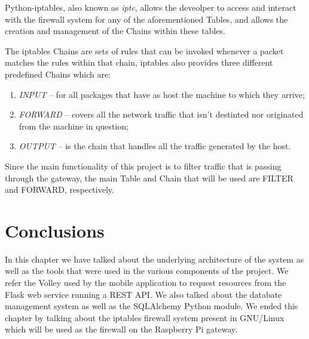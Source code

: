 Python-iptables, also known as \emph{iptc}, allows the deveolper to access and
interact with the firewall system for any of the aforementioned Tables, and
allows the creation and management of the Chains within these tables.

The iptables Chains are sets of rules that can be invoked whenever a packet
matches the rules within that chain, iptables also provides three different
predefined Chains which are:
\begin{enumerate}
	\item \emph{INPUT} -- for all packages that have as host the machine to
		which they arrive;
	\item \emph{FORWARD} -- covers all the network traffic that isn't destinted
		nor originated from the machine in question;
	\item \emph{OUTPUT} -- is the chain that handles all the traffic generated
		by the host.
\end{enumerate}

Since the main functionality of this project is to filter traffic that is
passing through the gateway, the main Table and Chain that will be used are
FILTER and FORWARD, respectively.

\section{Conclusions}
\label{chap3:sec:concs}
In this chapter we have talked about the underlying architecture of the system
as well as the tools that were used in the various components of the project.
We refer the Volley used by the mobile application to request resources from the
Flask web service running a REST API. We also talked about the databate
management system as well as the SQLAlchemy Python module. We ended this chapter
by talking about the iptables firewall system present in GNU/Linux which will be
used as the firewall on the Raspberry Pi gateway.

